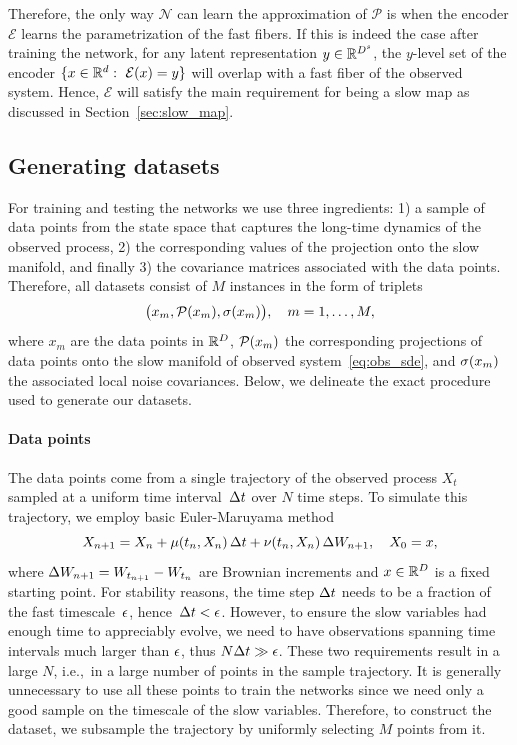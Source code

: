 \documentclass{article}
\newcommand{\enc}{\mathcal{E}} %
\newcommand{\net}{\mathcal{N}} %
\newcommand{\proj}{\mathcal{P}} %
\begin{document}
Therefore, the only way $\net$ can learn the approximation of $\proj$ is when the encoder $\enc$ learns the parametrization of the fast fibers. If this is indeed the case after training the network, for any latent representation $y\in\mathbb{R}^{D^s}$, the $y$-level set of the encoder $\{x\in\R^d:\ \enc(x)=y\}$ will overlap with a fast fiber of the observed system. Hence, $\enc$ will satisfy the main requirement for being a slow map as discussed in Section~\ref{sec:slow_map}.

\subsection{Generating datasets}\label{sec:dataset}
For training and testing the networks we use three ingredients: 1) a sample of data points from the state space that captures the long-time dynamics of the observed process, 2) the corresponding values of the projection onto the slow manifold, and finally 3) the covariance matrices associated with the data points. Therefore, all datasets consist of $M$ instances in the form of triplets
\begin{equation*}
    \big(x_m, \mathcal{P}(x_m), \sigma(x_m)\big),\quad m=1,\dotsc,M,
\end{equation*}
where $x_m$ are the data points in $\mathbb{R}^D$, $\mathcal{P}(x_m)$ the corresponding projections of data points onto the slow manifold of observed system~\eqref{eq:obs_sde}, and $\sigma(x_m)$ the associated local noise covariances. Below, we delineate the exact procedure used to generate our datasets.

\paragraph{Data points}
The data points come from a single trajectory of the observed process $X_t$ sampled at a uniform time interval~$\Delta t$ over $N$ time steps. To simulate this trajectory, we employ basic Euler-Maruyama method
\begin{equation}\label{eq:em}
    X_{n+1} = X_n + \mu(t_n, X_n)\,\Delta t + \nu(t_n,X_n)\,\Delta W_{n+1},\quad X_0 = x,
\end{equation}
where $\Delta W_{n+1} = W_{t_{n+1}} - W_{t_n}$ are Brownian increments and $x\in\mathbb{R}^D$ is a fixed starting point. For stability reasons, the time step $\Delta t$ needs to be a fraction of the fast timescale~$\epsilon$, hence~$\Delta t < \epsilon$. However, to ensure the slow variables had enough time to appreciably evolve, we need to have observations spanning time intervals much larger than $\epsilon$, thus $N\Delta t \gg \epsilon$. These two requirements result in a large $N$, i.e.,~in a large number of points in the sample trajectory. It is generally unnecessary to use all these points to train the networks since we need only a good sample on the timescale of the slow variables. Therefore, to construct the dataset, we subsample the trajectory by uniformly selecting $M$ points from it.
\end{document}
